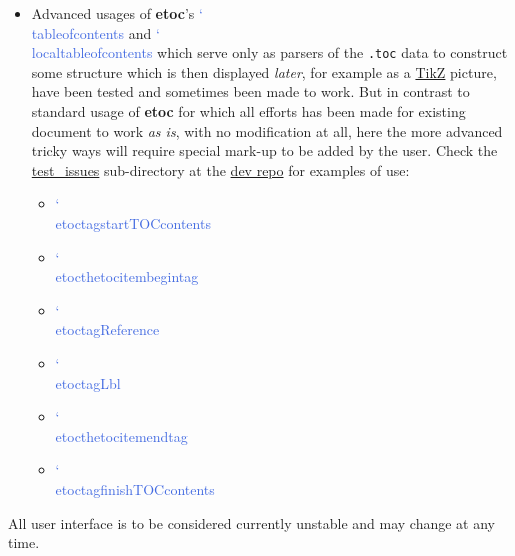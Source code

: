 \documentclass{article}
\DeclareRobustCommand\csa [1]
                {{\ttfamily\hyphenchar\font45 \char`\\ #1}}
\def\csb#1{\textcolor{RoyalBlue}{\csa{#1}}}
\newcommand\etoc{%
        \texorpdfstring{{\color{joli}\ttfamily\bfseries etoc}}{etoc}\xspace}
\newcommand\toc{\csb{tableofcontents}\xspace}
\newcommand\localtoc{\csb{localtableofcontents}\xspace}
\begin{document}
\begin{itemize}
\item Advanced usages of \etoc's \toc and \localtoc which serve only as
  parsers of the \texttt{.toc} data to construct some structure which is then
  displayed \emph{later}, for example as a
  \href{https://ctan.org/pkg/tikz}{TikZ} picture, have been tested and
  sometimes been made to work.  But in contrast to standard usage of \etoc for
  which all efforts has been made for existing document to work \emph{as is},
  with no modification at all, here the more advanced tricky ways will require
  special mark-up to be added by the user.  Check the
  \href{https://github.com/jfbu/etoc/test_issues}{test_issues} sub-directory
  at the \href{https://github.com/jfbu/etoc}{dev repo} for examples of use:
  \begin{itemize}
    \item \csb{etoctagstartTOCcontents}
    \item \csb{etocthetocitembegintag}
    \item \csb{etoctagReference}
    \item \csb{etoctagLbl}
    \item \csb{etocthetocitemendtag}
    \item \csb{etoctagfinishTOCcontents}
  \end{itemize}
\end{itemize}

\begingroup{}
\begin{shaded}
  All user interface is to be considered currently unstable and may change at
any time.
\end{shaded}
\endgroup
\end{document}
